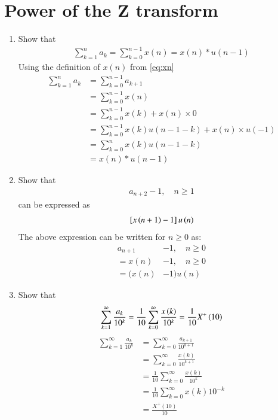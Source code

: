 \documentclass[journal,12pt,twocolumn]{IEEEtran}
\renewcommand\thesection{\arabic{section}}
\begin{document}
\section{Power of the Z transform}
\begin{enumerate}[label=\thesection.\arabic*,ref=\thesection.\theenumi]
\item Show that 
\begin{align}
	\sum_{k=1}^{n}a_k = 
	\sum_{k=0}^{n-1}x(n) = x(n)*u(n-1)
\end{align}
\solution Using the definition of $x(n)$ from \eqref{eq:xn}\begin{align}
    \sum_{k=1}^na_k &= \sum_{k=0}^{n-1}a_{k+1}\\
    &= \sum_{k=0}^{n-1}x(n)\\
    &= \sum_{k=0}^{n-1}x(k)+x(n)\times0\\
    &= \sum_{k=0}^{n-1}x(k)u(n-1-k)+x(n)\times u(-1)\\
    &= \sum_{k=0}^{n}x(k)u(n-1-k)\\
    &= x(n)*u(n-1) \label{eq:ak}
\end{align}

\item Show that 
\begin{align}
a_{n+2}-1, \quad n \ge 1
\end{align}
can be expressed as 
\begin{align}
	{}\left[x\left(n+1\right)-1\right]u\left(n\right)
\end{align}
\solution The above expression can be written for $n\geq0$ as:
\begin{align}
    a_{n+1}&-1, \quad n\ge0\\
    = x(n)&-1, \quad n\ge0\\
    = (x(n)&-1)u(n)
\end{align}


 \item Show that 
\begin{align}
	\sum_{k=1}^{\infty}\frac{a_k}{10^k}= 
	\frac{1}{10}\sum_{k=0}^{\infty}\frac{x\left(k\right)}{10^k} =\frac{1}{10}X^{+}\left({10}\right)
\end{align}
\solution\begin{align}
    	\sum_{k=1}^{\infty}\frac{a_k}{10^k}&=\sum_{k=0}^{\infty}\frac{a_{k+1}}{10^{k+1}}\\
    	&= \sum_{k=0}^{\infty}\frac{x(k)}{10^{k+1}}\\
        &=\frac{1}{10}\sum_{k=0}^{\infty}\frac{x(k)}{10^{k}}\\
        &=\frac{1}{10}\sum_{k=0}^{\infty}x(k)10^{-k}\\
        &= \frac{X^+(10)}{10}\label{eq:az10}
\end{align}


\end{enumerate}
\end{document}
